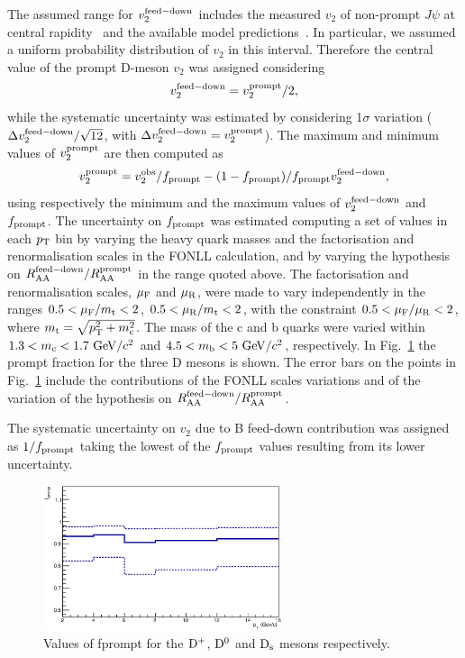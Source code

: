 The assumed range for $v_2^{\rm feed-down}$ includes the measured $v_2$ 
of non-prompt $J\psi$ at central rapidity~\cite{Khachatryan:2016ypw} and the available 
model predictions~\cite{Aichelin:2012ww,Uphoff:2012gb,Greco:2007sz,Gossiaux, BAMPS, Rapp}. 
In particular, we assumed a uniform probability distribution of $v_2$ in this interval. 
Therefore the central value of the prompt D-meson $v_2$ was assigned considering 
\begin{equation}
v_2^{\rm feed-down}=v_2^{\rm prompt}/2,
\end{equation}
while the systematic uncertainty was 
estimated by considering 1$\sigma$ variation ($\Delta v_2^{\rm feed-down}/\sqrt{12}$, with 
$\Delta v_2^{\rm feed-down} = v_2^{\rm prompt}$). 
The maximum and minimum values of $v_2^{\rm prompt}$ are then computed as
\begin{equation}
v_{2}^{\rm prompt}=v_{2}^{\rm obs}/f_{\rm prompt} - (1-f_{\rm prompt})/f_{\rm prompt}v_{2}^{\rm feed-down},
\end{equation} 
using respectively the minimum and the maximum values of $v_{\rm 2}^{\rm feed-down}$ and $f_{\rm prompt}$. 
The uncertainty on $f_{\rm prompt}$ was estimated 
computing a set of values in each $p_{\rm T}$ bin by
varying the heavy quark masses and the factorisation and renormalisation 
scales in the FONLL calculation, and by varying the hypothesis 
on $R_{\rm AA}^{\rm feed-down}/R_{\rm AA}^{\rm prompt}$ in the range quoted above.
The factorisation and renormalisation 
scales, $\mu_{\rm F}$ and $\mu_{\rm R}$, were made to vary independently 
in the ranges $0.5<\mu_{\rm F}/m_{\rm t}<2$, $0.5<\mu_{\rm R}/m_{\rm t}<2$, 
with the constraint $0.5<\mu_{\rm F}/\mu_{\rm R}<2$, 
where $m_{\rm t}=\sqrt{p_{\rm T}^2+m_{\rm c}^2}$.
The mass of the c and b quarks were varied within $1.3<m_{\rm c}<1.7~\mathrm{GeV}/c^2$ 
and $4.5<m_{\rm b}<5~\mathrm{GeV}/c^2$, respectively.
In Fig.~\ref{fig:fPrompt} the prompt fraction for the three D mesons is shown.
The error bars on the points in Fig.~\ref{fig:fPrompt} include the
contributions of the FONLL scales variations and of the variation of
the hypothesis on $R_{\rm AA}^{\rm feed-down}/R_{\rm AA}^{\rm prompt}$.

The systematic uncertainty on $v_2$ due to B feed-down contribution
was assigned as $1/f_{\rm prompt}$ taking the lowest of the
$f_{\rm prompt}$ values resulting from its lower uncertainty.


\begin{figure}
 \centering
 \includegraphics[width=7cm]{FigCap5/fprompt_3050.eps}
\caption{Values of fprompt for the ${\rm D^+}$, ${\rm D^0}$ and ${\rm D_s}$ mesons respectively.}
\label{fig:fPrompt}
\end{figure}

